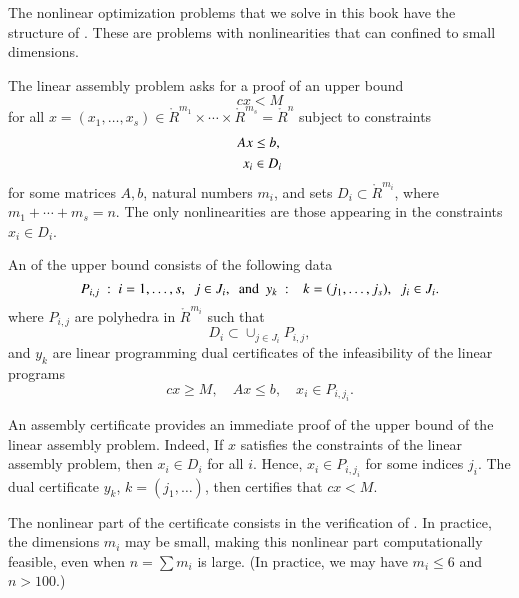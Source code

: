 The nonlinear optimization problems that we solve in this book have
the structure of .  These are
problems with nonlinearities that can confined to small dimensions.

The linear assembly problem asks for a proof of an upper bound
\begin{equation}\label{eqn:cxM}
c x < M
\end{equation}
for all $x=(x_1,\ldots,x_s)\in \ring{R}^{m_1}\times\cdots
\times\ring{R}^{m_s}=\ring{R}^n$
subject to constraints
\begin{align}
A x &\le b,\notag\\
x_i &\in D_i\notag
\end{align}
for some matrices $A,b$, natural numbers $m_i$, and sets $D_i\subset
\ring{R}^{m_i}$, where $m_1+\cdots+m_s = n$.  The only nonlinearities
are those appearing in the constraints $x_i\in D_i$.

An  of the upper bound 
consists of the following data
\[
P_{i,j}\ :\  i=1,\ldots,s,~~j\in J_i,\text{ \ and \ }  
y_k\ :\ ~~k=(j_1,\ldots,j_s),~~j_i\in J_i.
\]
where $P_{i,j}$ are polyhedra in $\ring{R}^{m_i}$ such that 
\begin{equation}\label{eqn:DP}
D_i \subset\cup_{j\in J_i} P_{i,j},
\end{equation} and $y_k$ are linear programming
dual certificates of the infeasibility of the linear programs
\[
c x \ge M,\quad A x \le b,\quad x_i\in P_{i,j_i}.
\]

An assembly certificate provides an immediate proof of the upper bound
of the linear assembly problem.  Indeed, If $x$ satisfies the
constraints of the linear assembly problem, then $x_i\in D_i$ for all
$i$.  Hence, $x_i\in P_{i,j_i}$ for some indices $j_i$.  The dual
certificate $y_k$, $k=(j_1,\ldots)$, then certifies that $c x < M$.

The nonlinear part of the certificate consists in the verification
of .  In practice, the dimensions $m_i$
may be small, making this nonlinear part computationally feasible,
even when $n=\sum m_i$ is large.  (In practice, we may have $m_i\le 6$
and $n > 100$.)

